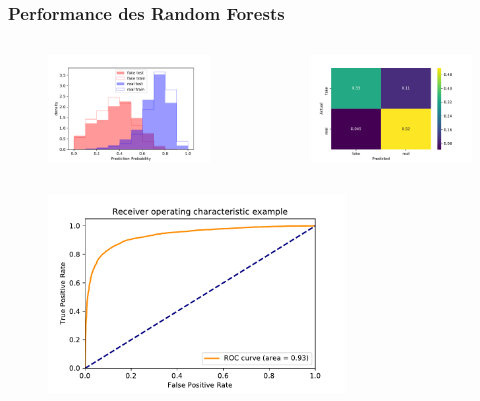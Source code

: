 \documentclass[aspectratio=1610, professionalfonts, 9pt]{beamer}
\begin{document}
  \begin{frame}
    \frametitle{Performance des Random Forests}
    \begin{columns}
      \begin{figure}
          \includegraphics[width=\textwidth]{pictures/bow/RF/prob_bow_best_nn.pdf}
          \caption{}
          \label{}
      \end{figure}

      \begin{figure}
          \includegraphics[width=\textwidth]{pictures/bow/RF/cnfsn_mtx_bow_best_nn.pdf}
          \caption{}
          \label{}
      \end{figure}
    \end{columns}
  \end{frame}

  \begin{frame}
    \begin{figure}
        \includegraphics[width=0.7\textwidth]{pictures/bow/RF/roc_Hyperopt_bow_best_nn.pdf}
        \caption{}
        \label{}
    \end{figure}
  \end{frame}
\end{document}
